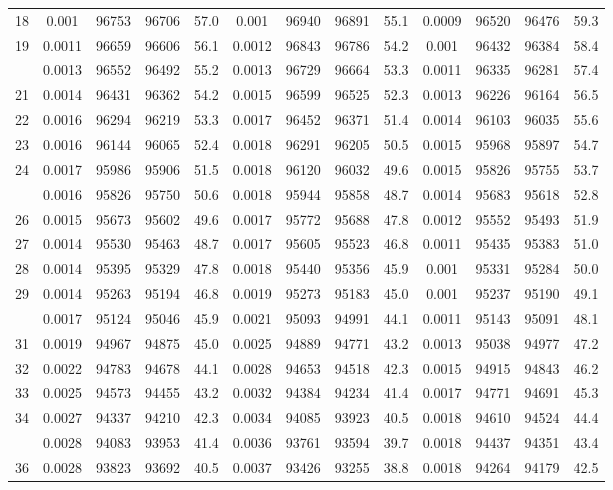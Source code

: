 \documentclass[
  14pt,
]{article}
\begin{document}
\begin{longtable}[t]{lcccccccccccc}
18 & 0.001 & 96753 & 96706 & 57.0 & 0.001 & 96940 & 96891 & 55.1 & 0.0009 & 96520 & 96476 & 59.3\\
19 & 0.0011 & 96659 & 96606 & 56.1 & 0.0012 & 96843 & 96786 & 54.2 & 0.001 & 96432 & 96384 & 58.4\\
\addlinespace
20 & 0.0013 & 96552 & 96492 & 55.2 & 0.0013 & 96729 & 96664 & 53.3 & 0.0011 & 96335 & 96281 & 57.4\\
21 & 0.0014 & 96431 & 96362 & 54.2 & 0.0015 & 96599 & 96525 & 52.3 & 0.0013 & 96226 & 96164 & 56.5\\
22 & 0.0016 & 96294 & 96219 & 53.3 & 0.0017 & 96452 & 96371 & 51.4 & 0.0014 & 96103 & 96035 & 55.6\\
23 & 0.0016 & 96144 & 96065 & 52.4 & 0.0018 & 96291 & 96205 & 50.5 & 0.0015 & 95968 & 95897 & 54.7\\
24 & 0.0017 & 95986 & 95906 & 51.5 & 0.0018 & 96120 & 96032 & 49.6 & 0.0015 & 95826 & 95755 & 53.7\\
\addlinespace
25 & 0.0016 & 95826 & 95750 & 50.6 & 0.0018 & 95944 & 95858 & 48.7 & 0.0014 & 95683 & 95618 & 52.8\\
26 & 0.0015 & 95673 & 95602 & 49.6 & 0.0017 & 95772 & 95688 & 47.8 & 0.0012 & 95552 & 95493 & 51.9\\
27 & 0.0014 & 95530 & 95463 & 48.7 & 0.0017 & 95605 & 95523 & 46.8 & 0.0011 & 95435 & 95383 & 51.0\\
28 & 0.0014 & 95395 & 95329 & 47.8 & 0.0018 & 95440 & 95356 & 45.9 & 0.001 & 95331 & 95284 & 50.0\\
29 & 0.0014 & 95263 & 95194 & 46.8 & 0.0019 & 95273 & 95183 & 45.0 & 0.001 & 95237 & 95190 & 49.1\\
\addlinespace
30 & 0.0017 & 95124 & 95046 & 45.9 & 0.0021 & 95093 & 94991 & 44.1 & 0.0011 & 95143 & 95091 & 48.1\\
31 & 0.0019 & 94967 & 94875 & 45.0 & 0.0025 & 94889 & 94771 & 43.2 & 0.0013 & 95038 & 94977 & 47.2\\
32 & 0.0022 & 94783 & 94678 & 44.1 & 0.0028 & 94653 & 94518 & 42.3 & 0.0015 & 94915 & 94843 & 46.2\\
33 & 0.0025 & 94573 & 94455 & 43.2 & 0.0032 & 94384 & 94234 & 41.4 & 0.0017 & 94771 & 94691 & 45.3\\
34 & 0.0027 & 94337 & 94210 & 42.3 & 0.0034 & 94085 & 93923 & 40.5 & 0.0018 & 94610 & 94524 & 44.4\\
\addlinespace
35 & 0.0028 & 94083 & 93953 & 41.4 & 0.0036 & 93761 & 93594 & 39.7 & 0.0018 & 94437 & 94351 & 43.4\\
36 & 0.0028 & 93823 & 93692 & 40.5 & 0.0037 & 93426 & 93255 & 38.8 & 0.0018 & 94264 & 94179 & 42.5\\

\end{longtable}
\end{document}
